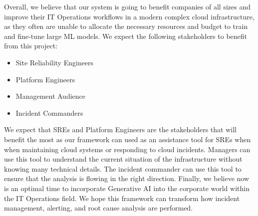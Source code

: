 \documentclass[conference]{IEEEtran}
\begin{document}
Overall, we believe that our system is going to benefit companies of all sizes and improve their IT Operations workflows in a modern complex cloud infrastructure, as they often are unable to allocate the necessary resources and budget to train and fine-tune large ML models. We expect the following stakeholders to benefit from this project:
\begin{itemize}
    \item Site Reliability Engineers
    \item Platform Engineers 
    \item Management Audience 
    \item Incident Commanders 
\end{itemize}

We expect that SREs and Platform Engineers are the stakeholders that will benefit the most as our framework can used as an assistance tool for SREs when when maintaining cloud systems or responding to cloud incidents. Managers can use this tool to understand the current situation of the infrastructure without knowing many technical details. The incident commander can use this tool to ensure that the analysis is flowing in the right direction. Finally, we believe now is an optimal time to incorporate Generative AI into the corporate world within the IT Operations field. We hope this framework can transform how incident management, alerting, and root cause analysis are performed. 



\vspace{12pt}
\end{document}
